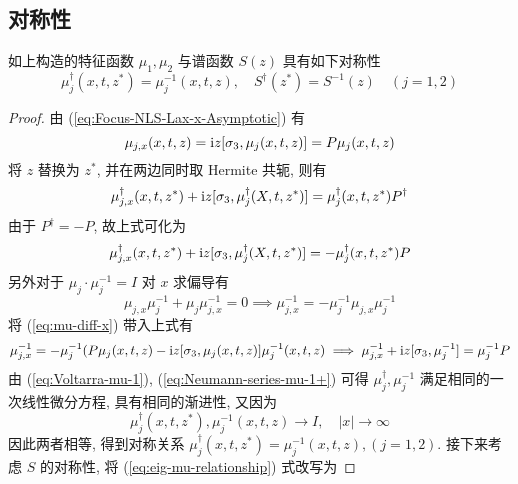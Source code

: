 \subsection{对称性}
\begin{theorem}
  如上构造的特征函数 $ \mu_{1}, \mu_{2} $ 与谱函数 $ S(z) $ 具有如下对称性
  \begin{equation}
    \mu_{j}^{\dagger}(x,t,z^{*}) = \mu_{j}^{-1}(x,t,z), \quad S^{\dagger}(z^{*}) = S^{-1}(z) \quad( j = 1,2 )
  \end{equation}
\end{theorem}
\begin{proof}
  由 (\ref{eq:Focus-NLS-Lax-x-Asymptotic}) 有
  \begin{equation}
    \mu_{j,x}(x,t,z) = \mathrm{i} z [\sigma_{3}, \mu_{j}(x,t,z)] = P \mu_{j}(x,t,z) \label{eq:mu-diff-x}
  \end{equation}
  将 $ z $ 替换为 $ z^{*} $, 并在两边同时取 Hermite 共轭, 则有
  \begin{equation}
    \mu_{j,x}^{\dagger}(x,t,z^{*}) + \mathrm{i} z [\sigma_{3}, \mu_{j}^{\dagger}(X,t,z^{*})] = \mu_{j}^{\dagger}(x,t,z^{*}) P^{\dagger} 
  \end{equation}
  由于 $ P^{\dagger} = -P $, 故上式可化为
  \begin{equation}
    \mu_{j,x}^{\dagger}(x,t,z^{*}) + \mathrm{i} z [\sigma_{3}, \mu_{j}^{\dagger}(X,t,z^{*})] = - \mu_{j}^{\dagger}(x,t,z^{*}) P 
  \end{equation}
  另外对于 $ \mu_{j} \cdot \mu_{j}^{-1} = I $ 对 $ x $ 求偏导有
  \begin{equation}
    \mu_{j,x} \mu_{j}^{-1} + \mu_{j} \mu_{j,x}^{-1} = 0 \implies \mu_{j,x}^{-1}  = - \mu_{j}^{-1} \mu_{j,x} \mu_{j}^{-1}
  \end{equation}
  将 (\ref{eq:mu-diff-x}) 带入上式有 
  \begin{equation}
    \mu_{j,x}^{-1} = - \mu_{j}^{-1} ( P \mu_{j}(x,t,z) - \mathrm{i} z [\sigma_{3}, \mu_{j}(x,t,z)] \mu_{j}^{-1}(x,t,z) \implies \mu_{j,x}^{-1} + \mathrm{i} z [\sigma_{3},\mu_{j}^{-1}] = \mu_{j}^{-1} P
  \end{equation}
  由 (\ref{eq:Voltarra-mu-1}), (\ref{eq:Neumann-series-mu-1+}) 可得 $ \mu_{j}^{\dagger}, \mu_{j}^{-1} $ 满足相同的一次线性微分方程, 具有相同的渐进性, 又因为
  \begin{equation}
    \mu_{j}^{\dagger}(x,t,z^{*}) , \mu_{j}^{-1}(x,t,z) \to I , \quad | x | \to \infty \label{eq:mu-Hermitian-asymptotic}
  \end{equation}
  因此两者相等, 得到对称关系 $ \mu_{j}^{\dagger}(x,t,z^{*}) = \mu_{j}^{-1}(x,t,z), (j = 1,2) $. 接下来考虑 $ S $ 的对称性, 将 (\ref{eq:eig-mu-relationship}) 式改写为

\end{proof}
